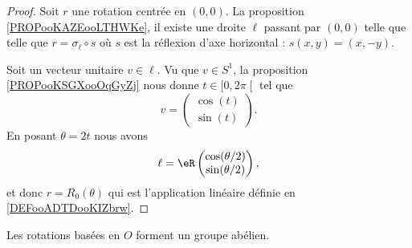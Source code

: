 \begin{proof}
    Soit \( r\) une rotation centrée en \( (0,0)\). La proposition \ref{PROPooKAZEooLTHWKe}, il existe une droite \( \ell\) passant par \( (0,0)\) telle que telle que \( r=\sigma_{\ell}\circ s\) où \( s\) est la réflexion d'axe horizontal : \( s(x,y)=(x,-y)\).

    Soit un vecteur unitaire \( v\in \ell\). Vu que \( v\in S^1\), la proposition \ref{PROPooKSGXooOqGyZj} nous donne \( t\in \mathopen[ 0 ,2\pi  \mathclose[\) tel que
        \begin{equation}
            v=\begin{pmatrix}
                \cos(t)    \\ 
                \sin(t)    
            \end{pmatrix}.
        \end{equation}
        En posant \( \theta=2 t\) nous avons
        \begin{equation}
            \ell=\eR\begin{pmatrix}
                \cos(\theta/2)    \\ 
                \sin(\theta/2)    
            \end{pmatrix},
        \end{equation}
        et donc \( r=R_0(\theta)\) qui est l'application linéaire définie en \ref{DEFooADTDooKIZbrw}.
\end{proof}

\begin{proposition}      \label{PROPooWMESooNJMdxf}
    Les rotations basées en \( O\) forment un groupe abélien.
\end{proposition}

